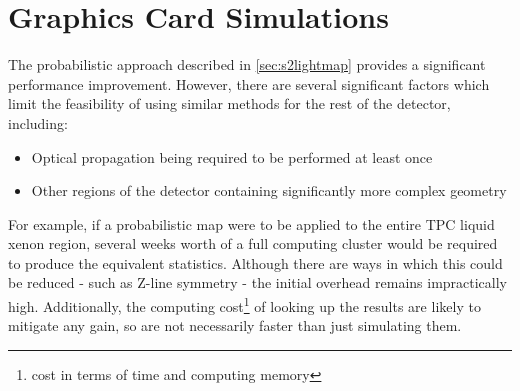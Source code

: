 \section{Graphics Card Simulations}

\par
The probabilistic approach described in \autoref{sec:s2lightmap} provides a significant performance improvement. 
However, there are several significant factors which limit the feasibility of using similar methods for the rest of the detector, including:
\begin{itemize}
    \item Optical propagation being required to be performed at least once
    \item Other regions of the detector containing significantly more complex geometry
\end{itemize}
For example, if a probabilistic map were to be applied to the entire TPC liquid xenon region, several weeks worth of a full computing cluster would be required to produce the equivalent statistics.
Although there are ways in which this could be reduced - such as Z-line symmetry - the initial overhead remains impractically high.
Additionally, the computing cost\footnote{cost in terms of time and computing memory} of looking up the results are likely to mitigate any gain, so are not necessarily faster than just simulating them.

